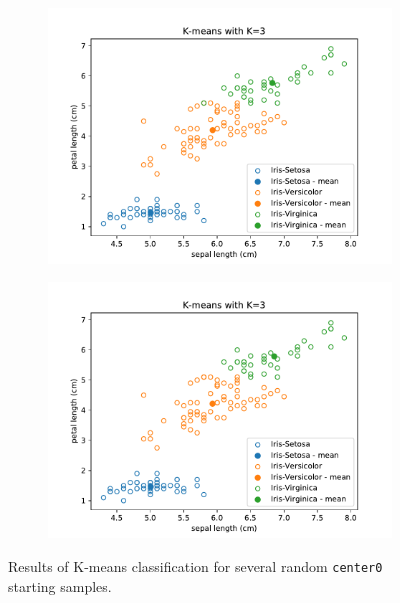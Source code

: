 \documentclass{article}
\begin{document}
\begin{figure}[!ht]
{\begin{subfigure}{0.6\textwidth}
	\includegraphics[width=\textwidth]{./Figures/2_2_Kmeans_randinit2}
	\end{subfigure}
	\begin{subfigure}{0.6\textwidth}
	\includegraphics[width=\textwidth]{./Figures/2_2_Kmeans_randinit3}
	\end{subfigure}
	}	
	\caption{Results of K-means classification for several random \texttt{center0} starting samples.}
	\label{2_2_Kmeans_randinit}
\end{figure}
\end{document}
